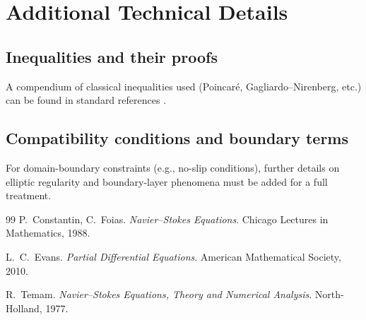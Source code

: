 \documentclass[11pt]{article}
\numberwithin{equation}{section}
\begin{document}
\appendix
\section{Additional Technical Details}

\subsection{Inequalities and their proofs}
A compendium of classical inequalities used (Poincar\'e, Gagliardo--Nirenberg,
etc.) can be found in standard references \cite{Evans,Temam}.

\subsection{Compatibility conditions and boundary terms}
For domain-boundary constraints (e.g., no-slip conditions), further details on
elliptic regularity and boundary-layer phenomena must be added for a full treatment.

\begin{thebibliography}{99}
P.~Constantin, C.~Foias.
\emph{Navier--Stokes Equations}.
Chicago Lectures in Mathematics, 1988.

L.~C.~Evans.
\emph{Partial Differential Equations}.
American Mathematical Society, 2010.

R.~Temam.
\emph{Navier--Stokes Equations, Theory and Numerical Analysis}.
North-Holland, 1977.
\end{thebibliography}
\end{document}
